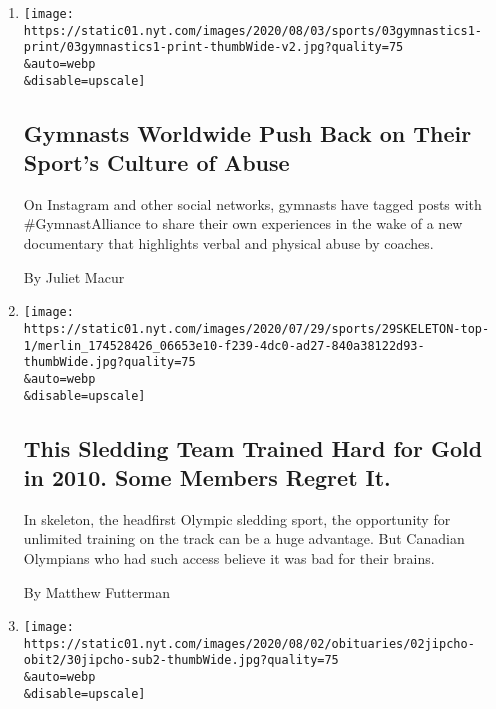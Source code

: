 \begin{enumerate}
\def\labelenumi{\arabic{enumi}.}
\item
  \href{/2020/08/03/sports/olympics/gymnastics-abuse-athlete-a.html}{}

  \texttt{[image: https://static01.nyt.com/images/2020/08/03/sports/03gymnastics1-print/03gymnastics1-print-thumbWide-v2.jpg?quality=75\\\&auto=webp\\\&disable=upscale]}

  \hypertarget{gymnasts-worldwide-push-back-on-their-sports-culture-of-abuse}{%
  \subsection{Gymnasts Worldwide Push Back on Their Sport's Culture of
  Abuse}\label{gymnasts-worldwide-push-back-on-their-sports-culture-of-abuse}}

  On Instagram and other social networks, gymnasts have tagged posts
  with \#GymnastAlliance to share their own experiences in the wake of a
  new documentary that highlights verbal and physical abuse by coaches.

  By Juliet Macur
\item
  \href{/2020/08/01/sports/olympics/concussion-skeleton-sledding-brain-damage.html}{}

  \texttt{[image: https://static01.nyt.com/images/2020/07/29/sports/29SKELETON-top-1/merlin\_174528426\_06653e10-f239-4dc0-ad27-840a38122d93-thumbWide.jpg?quality=75\\\&auto=webp\\\&disable=upscale]}

  \hypertarget{this-sledding-team-trained-hard-for-gold-in-2010-some-members-regret-it}{%
  \subsection{This Sledding Team Trained Hard for Gold in 2010. Some
  Members Regret
  It.}\label{this-sledding-team-trained-hard-for-gold-in-2010-some-members-regret-it}}

  In skeleton, the headfirst Olympic sledding sport, the opportunity for
  unlimited training on the track can be a huge advantage. But Canadian
  Olympians who had such access believe it was bad for their brains.

  By Matthew Futterman
\item
  \href{/2020/07/30/sports/olympics/ben-jipcho-dead.html}{}

  \texttt{[image: https://static01.nyt.com/images/2020/08/02/obituaries/02jipcho-obit2/30jipcho-sub2-thumbWide.jpg?quality=75\\\&auto=webp\\\&disable=upscale]}


\end{enumerate}
